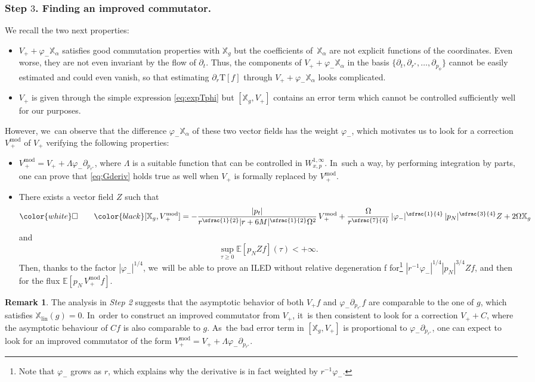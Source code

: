 \documentclass[10pt]{amsart}
\theoremstyle{plain}
\theoremstyle{definition}
\newtheorem{remark}[proposition]{Remark}
\newcommand\T{{\mathbb{X}}}
\begin{document}
\subsubsection{Step $3$. Finding an improved commutator.} We recall the two next properties:
\begin{itemize}
\item $V_++\varphi_- \T_\alpha$ satisfies good commutation properties with $\T_g$ but the coefficients of~$\T_\alpha$ are not explicit functions of the coordinates. Even worse, they are not even invariant by the flow of $\partial_t$. Thus, the components of $V_++\varphi_- \T_\alpha$ in the basis $\{\partial_t,\partial_{r^*},\dots, \partial_{p_\phi}\}$ cannot be easily estimated and could even vanish, so that estimating $\partial_r\mathrm{T}[f]$ through $V_++\varphi_- \T_\alpha$ looks complicated.
\item $V_+$ is given through the simple expression \eqref{eq:expTphi} but $[\T_g,V_+]$ contains an error term which cannot be controlled sufficiently well for our purposes.
\end{itemize}
However, we~can observe that the difference $\varphi_- \T_\alpha$ of these two vector fields has the weight $\varphi_-$, which motivates us to look for a correction $V_{\, +}^{\mathrm{mod}}$ of $V_+$ verifying the following properties:
\begin{itemize}
\item $V_{\, +}^{\mathrm{mod}} = V_++\Lambda \varphi_- \partial_{p_{r^*}}$, where $\Lambda$ is a suitable function that can be controlled in $W^{1,\infty}_{x,p}$. In~such a way, by performing integration by parts, one can prove that \eqref{eq:Gderiv} holds true as well when $V_+$ is formally replaced by $V_{\, +}^{\mathrm{mod}}$.
\item There exists a vector field $Z$ such that
\[
\color{white} \square \qquad \color{black} [\T_g,V_{\, +}^{\mathrm{mod}}]= - \frac{|p_t|}{r^{\sfrac{1}{2}}|r+6M|^{\sfrac{1}{2}}\Omega^2}\, V_{\, +}^{\mathrm{mod}}+\frac{\Omega}{r^{\sfrac{7}{4}}}\,|\varphi_-|^{\sfrac{1}{4}}\,|p_N|^{\sfrac{3}{4}} Z+2\Omega \T_g
\]
and
\[
\sup_{\tau \geq 0} \mathbb{E}[p_N Zf](\tau) < +\infty.
\]
Then, thanks to the factor $|\varphi_-|^{1/4}$, we~will be able to prove an ILED without relative degeneration \color{white}f\color{black} for\footnote{Note that $\varphi_-$ grows as $r$, which explains why the derivative is in fact weighted by $r^{-1}\varphi_-$.} $|r^{-1}\varphi_-|^{1/4}|p_N|^{3/4} Z f$, and then for the flux $\mathbb{E}[p_N \,V_{\, +}^{\mathrm{mod}} f]$.
\end{itemize}
\begin{remark}
The analysis in \textit{Step 2} suggests that the asymptotic behavior of both $V_+f$ and $\varphi_- \partial_{p_{r^*}}f$ are comparable to the one of $g$, which satisfies $\mathbb{X}_{\mathrm{lin}}(g)=0$. In~order to construct an improved commutator from $V_+$, it~is then consistent to look for a correction $V_++C$, where the asymptotic behaviour of $Cf$ is also comparable to $g$. As~the bad error term in $[\mathbb{X}_g,V_+]$ is proportional to $\varphi_- \partial_{p_{r^*}}$, one can expect to look for an improved commutator of the form $V_+^{\mathrm{mod}}= V_++\Lambda \varphi_- \partial_{p_{r^*}}$.
\end{remark}
\end{document}

